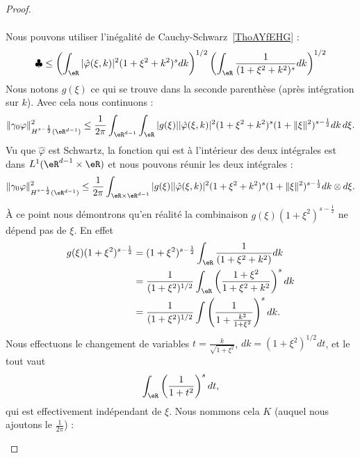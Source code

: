 \begin{proof}
\begin{subproof}
\begin{subequations}
\begin{align}
			\end{align}
		\end{subequations}
		Nous pouvons utiliser l'inégalité de Cauchy-Schwarz~\ref{ThoAYfEHG} :
		\begin{equation}
			\clubsuit\leq \left( \int_{\eR}| \hat \varphi(\xi,k) |^2(1+\xi^2+k^2)^sdk \right)^{1/2}\left( \int_{\eR}\frac{1}{ (1+\xi^2+k^2)^s }dk \right)^{1/2}
		\end{equation}
		Nous notons \( g(\xi)\) ce qui se trouve dans la seconde parenthèse (après intégration sur \( k\)). Avec cela nous continuons :
		\begin{equation}
			\| \gamma_0\varphi \|^2_{H^{s-\frac{ 1 }{2}}(\eR^{d-1})}\leq\frac{1}{ 2\pi }\int_{\eR^{d-1}}\int_{\eR}| g(\xi) | |\hat \varphi(\xi,k) |^2(1+\xi^2+k^2)^s(1+\| \xi \|^2)^{s-\frac{ 1 }{2}}dk\,d\xi.
		\end{equation}
		Vu que \( \hat \varphi\) est Schwartz, la fonction qui est à l'intérieur des deux intégrales est dans \( L^1(\eR^{d-1}\times \eR)\) et nous pouvons réunir les deux intégrales :
		\begin{equation}
			\| \gamma_0\varphi \|^2_{H^{s-\frac{ 1 }{2}}(\eR^{d-1})}\leq\frac{1}{ 2\pi }\int_{\eR\times \eR^{d-1}}| g(\xi) | |\hat \varphi(\xi,k) |^2(1+\xi^2+k^2)^s(1+\| \xi \|^2)^{s-\frac{ 1 }{2}}dk\otimes d\xi.
		\end{equation}
		À ce point nous démontrons qu'en réalité la combinaison \( g(\xi)(1+\xi^2)^{s-\frac{ 1 }{2}}\) ne dépend pas de \( \xi\). En effet
		\begin{subequations}
			\begin{align}
				g(\xi)(1+\xi^2)^{s-\frac{ 1 }{2}} & =(1+\xi^2)^{s-\frac{ 1 }{2}}\int_{\eR}\frac{1}{ (1+\xi^2+k^2) }dk                         \\
				                                  & =\frac{1}{ (1+\xi^2)^{1/2} }\int_{\eR}\left( \frac{ 1+\xi^2 }{ 1+\xi^2+k^2 } \right)^sdk  \\
				                                  & =\frac{1}{ (1+\xi^2)^{1/2} }\int\left( \frac{1}{ 1+\frac{ k^2 }{ 1+\xi^2 } } \right)^sdk.
			\end{align}
		\end{subequations}
		Nous effectuons le changement de variables \( t=\frac{ k }{ \sqrt{ 1+\xi^2 } }\), \( dk=(1+\xi^2)^{1/2}dt\), et le tout vaut
		\begin{equation}
			\int_{\eR}\left( \frac{1}{ 1+t^2 } \right)^sdt,
		\end{equation}
		qui est effectivement indépendant de \( \xi\). Nous nommons cela \( K\) (auquel nous ajoutons le \( \frac{1}{ 2\pi }\)) :

\end{subproof}
\end{proof}
